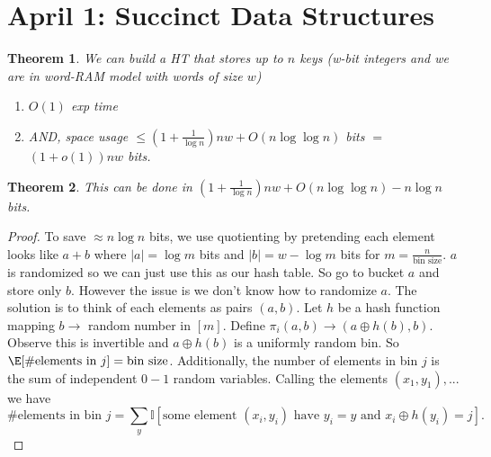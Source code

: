 \documentclass[a4paper]{article}
\newtheorem{thm}{Theorem}[section]
\begin{document}
\section{April 1: Succinct Data Structures}
\begin{thm}
    We can build a HT that stores up to $n$ keys (w-bit integers and we are in word-RAM model with words of size $w$)
    \begin{enumerate}
        \item $O(1)$ exp time
        \item AND, space usage $\leq  \left( 1+ \frac{1}{\log n} \right)nw+O(n\log \log n)$ bits $=$ $(1+o(1))nw$ bits.  
    \end{enumerate}
\end{thm}
\begin{thm}
    This can be done in $ \left( 1+\frac{1}{\log n} \right)nw+O(n\log \log n)-n\log n$ bits.
\end{thm}
\begin{proof}
    To save $\approx n\log n$ bits, we use quotienting by pretending each element looks like $a+b$ where $|a|=\log m$ bits and $|b|=w-\log m$ bits for $m= \frac{n}{ \text{bin size}}$. $a$ is randomized so we can just use this as our hash table. So go to bucket $a$ and store only $b.$ However the issue is we don't know how to randomize $a$. The solution is to think of each elements as pairs $(a,b)$. Let $h$ be a hash function mapping $b\to$ random number in $[m]$. Define $\pi_i(a,b)\to(a\oplus h(b),b)$. \\
    Observe this is invertible and $a\oplus h(b)$ is a uniformly random bin. So $\E[\# \text{elements in } j]= \text{bin size}$. Additionally, the number of elements in bin $j$ is the sum of independent $0-1$ random variables. Calling the elements $(x_1,y_1),...$ we have 
    \[
    \# \text{elements in bin } j=\sum_y \mathbb{I}[ \text{some element $(x_i,y_i)$ have $y_i=y$ and $x_i\oplus h(y_i)=j$}]
    .\] 
\end{proof}
\newpage
\end{document}

